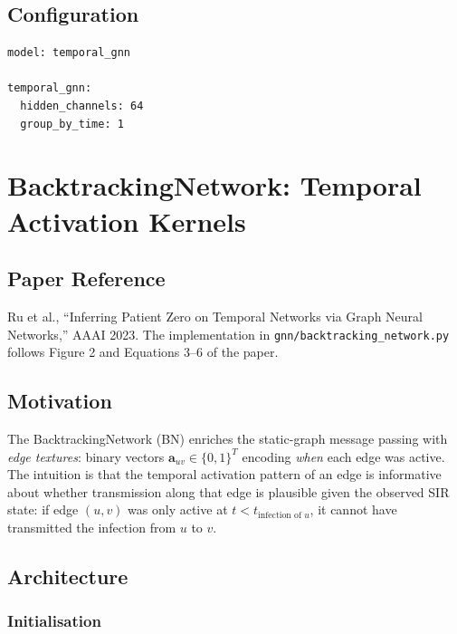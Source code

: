 \documentclass[12pt,a4paper]{report}
\begin{document}
\section{Configuration}

\begin{lstlisting}[language=bash,caption={TemporalGNN config (\texttt{exp/france\_office/temporal\_gnn.yml}).}]
model: temporal_gnn

temporal_gnn:
  hidden_channels: 64
  group_by_time: 1
\end{lstlisting}

\chapter{BacktrackingNetwork: Temporal Activation Kernels}
\label{chap:backtracking}

\section{Paper Reference}

Ru et al., ``Inferring Patient Zero on Temporal Networks via Graph Neural
Networks,'' AAAI 2023. The implementation in \texttt{gnn/backtracking\_network.py}
follows Figure 2 and Equations 3--6 of the paper.

\section{Motivation}

The BacktrackingNetwork (BN) enriches the static-graph message passing with
\emph{edge textures}: binary vectors $\mathbf{a}_{uv} \in \{0,1\}^T$ encoding
\emph{when} each edge was active. The intuition is that the temporal activation
pattern of an edge is informative about whether transmission along that edge is
plausible given the observed SIR state: if edge $(u,v)$ was only active at
$t < t_{\text{infection of } u}$, it cannot have transmitted the infection from
$u$ to $v$.

\section{Architecture}

\subsection{Initialisation}
\end{document}
